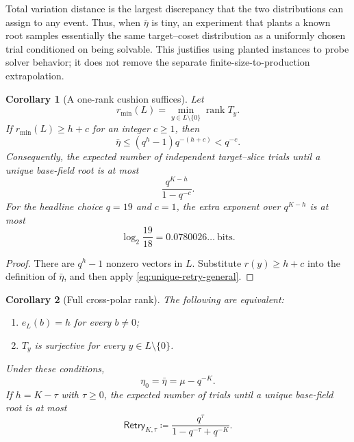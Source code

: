 \documentclass[11pt]{article}
\newtheorem{corollary}[corollary]{Corollary}
\newcommand{\rank}{\operatorname{rank}}
\begin{document}
Total variation distance is the largest discrepancy that the two distributions
can assign to any event.  Thus, when $\bar\eta$ is tiny, an experiment that
plants a known root samples essentially the same target--coset distribution as
a uniformly chosen trial conditioned on being solvable.  This justifies using
planted instances to probe solver behavior; it does not remove the separate
finite-size-to-production extrapolation.

\begin{corollary}[A one-rank cushion suffices]\label{cor:rank-cushion}
Let
\[
 r_{\min}(L)=\min_{y\in L\setminus\{0\}}\rank T_y.
\]
If $r_{\min}(L)\ge h+c$ for an integer $c\ge1$, then
\begin{equation}\label{eq:rank-cushion-eta}
 \bar\eta\le(q^h-1)q^{-(h+c)}<q^{-c}.
\end{equation}
Consequently, the expected number of independent target--slice trials until a
unique base-field root is at most
\begin{equation}\label{eq:rank-cushion-retry}
 \frac{q^{K-h}}{1-q^{-c}}.
\end{equation}
For the headline choice $q=19$ and $c=1$, the extra exponent over $q^{K-h}$
is at most
\[
 \log_2\frac{19}{18}=0.0780026\ldots\ \text{bits}.
\]
\end{corollary}

\begin{proof}
There are $q^h-1$ nonzero vectors in $L$.  Substitute
$r(y)\ge h+c$ into the definition of $\bar\eta$, and then apply
\eqref{eq:unique-retry-general}.
\end{proof}

\begin{corollary}[Full cross-polar rank]\label{cor:full-cross-rank}
The following are equivalent:
\begin{enumerate}[label=(\roman*)]
\item $e_L(b)=h$ for every $b\ne0$;
\item $T_y$ is surjective for every $y\in L\setminus\{0\}$.
\end{enumerate}
Under these conditions,
\[
 \eta_0=\bar\eta=\mu-q^{-K}.
\]
If $h=K-\tau$ with $\tau\ge0$, the expected number of trials until a unique
base-field root is at most
\begin{equation}\label{eq:unique-retry}
 \mathsf{Retry}_{K,\tau}\coloneqq
 \frac{q^\tau}{1-q^{-\tau}+q^{-K}}.
\end{equation}
\end{corollary}
\end{document}
